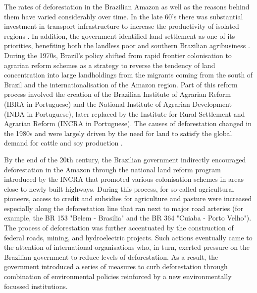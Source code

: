 The rates of deforestation in the Brazilian Amazon as well as the reasons behind them have varied considerably over time. In the late 60's there was substantial investment in transport infrastructure to increase the productivity of isolated regions \citep{BAYNARD}. In addition, the government identified land settlement as one of its priorities, benefiting both the landless poor and southern Brazilian agribusiness \citep{CALDAS,DIPROSE}. During the 1970s, Brazil's policy shifted from rapid frontier colonisation to agrarian reform schemes as a strategy to reverse the tendency of land concentration into large landholdings from the migrants coming from the south of Brazil and the internationalisation of the Amazon region.  Part of this reform process involved the creation of the Brazilian Institute of Agrarian Reform (IBRA in Portuguese) and the National Institute of Agrarian Development (INDA in Portuguese), later replaced by the Institute for Rural Settlement and Agrarian Reform (INCRA in Portuguese). The causes of deforestation changed in the 1980s and were largely driven by the need for land to satisfy the global demand for cattle and soy production \citep{CROPPER1,SOLER}.

By the end of the 20th century, the Brazilian government indirectly encouraged deforestation in the Amazon through the national land reform program introduced by the INCRA that promoted various colonisation schemes in areas close to newly built highways. During this process, for so-called agricultural pioneers, access to credit and subsidies for agriculture and pasture were increased especially along the deforestation line that ran next to major road arteries (for example, the BR 153 "Belem - Brasilia" and the BR 364 "Cuiaba - Porto Velho"). The process of deforestation was further accentuated by the construction of federal roads, mining, and hydroelectric projects. Such actions eventually came to the attention of international organisations who, in turn, exerted pressure on the Brazilian government to reduce levels of deforestation. As a result, the government introduced a series of measures to curb deforestation through combination of environmental policies reinforced by a new environmentally focussed institutions.

